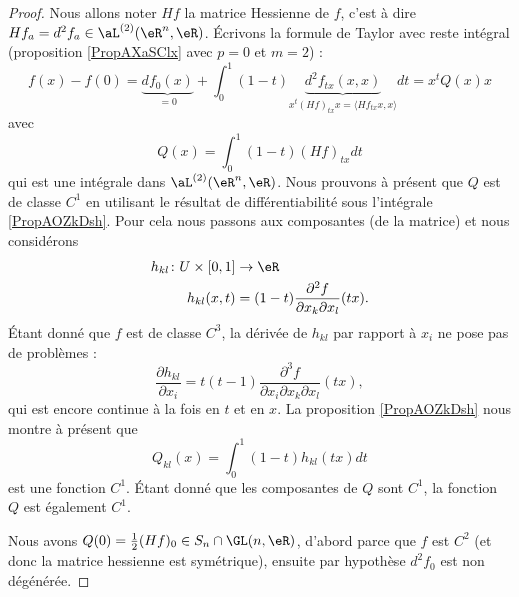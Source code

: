 \begin{proof}
    Nous allons noter \( Hf\) la matrice Hessienne de \( f\), c'est à dire \( Hf_a=d^2f_a\in\aL^{(2)}(\eR^n,\eR)\). Écrivons la formule de Taylor avec reste intégral (proposition \ref{PropAXaSClx} avec \( p=0\) et \( m=2\)) :
    \begin{equation}
        f(x)-f(0)=\underbrace{df_0(x)}_{=0}+\int_0^1(1-t)\underbrace{d^2f_{tx}(x,x)}_{x^t(Hf)_{tx}x=\langle Hf_{tx}x, x\rangle }dt=x^tQ(x)x
    \end{equation}
    avec
    \begin{equation}
        Q(x)=\int_0^1(1-t)(Hf)_{tx}dt
    \end{equation}
    qui est une intégrale dans \( \aL^{(2)}(\eR^n,\eR)\). Nous prouvons à présent que \( Q\) est de classe \( C^1\) en utilisant le résultat de différentiabilité sous l'intégrale \ref{PropAOZkDsh}. Pour cela nous passons aux composantes (de la matrice) et nous considérons
    \begin{equation}
        \begin{aligned}
            h_{kl}\colon U\times\mathopen[ 0 , 1 \mathclose]&\to \eR \\
            h_{kl}(x,t)&=(1-t)\frac{ \partial^2f  }{ \partial x_k\partial x_l }(tx).
        \end{aligned}
    \end{equation}
    Étant donné que \( f\) est de classe \( C^3\), la dérivée de \( h_{kl}\) par rapport à \( x_i\) ne pose pas de problèmes :
    \begin{equation}
        \frac{ \partial h_{kl} }{ \partial x_i }=t(t-1)\frac{ \partial^3f  }{ \partial x_i\partial x_k\partial x_l }(tx),
    \end{equation}
    qui est encore continue à la fois en \( t\) et en \( x\). La proposition \ref{PropAOZkDsh} nous montre à présent que
    \begin{equation}
        Q_{kl}(x)=\int_0^1(1-t)h_{kl}(tx)dt
    \end{equation}
    est une fonction \( C^1\). Étant donné que les composantes de \( Q\) sont \( C^1\), la fonction \( Q\) est également \( C^1\).

    Nous avons \( Q(0)=\frac{ 1 }{2}(Hf)_0\in S_n\cap \GL(n,\eR)\), d'abord parce que \( f\) est \( C^2\) (et donc la matrice hessienne est symétrique), ensuite par hypothèse \( d^2f_0\) est non dégénérée.


\end{proof}
